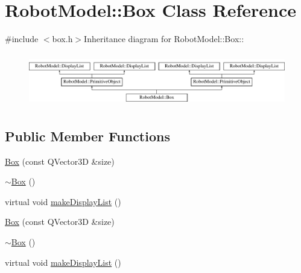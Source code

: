 \hypertarget{class_robot_model_1_1_box}{
\section{RobotModel::Box Class Reference}
\label{class_robot_model_1_1_box}
}


{\ttfamily \#include $<$box.h$>$}Inheritance diagram for RobotModel::Box::\begin{figure}[H]
\begin{center}
\leavevmode
\includegraphics[height=2.35955cm]{class_robot_model_1_1_box}
\end{center}
\end{figure}
\subsection*{Public Member Functions}
\begin{DoxyCompactItemize}
\item 
\hyperlink{class_robot_model_1_1_box_a4f394975b4dadbd1fa34d124f33772cb}{Box} (const QVector3D \&size)
\item 
\hyperlink{class_robot_model_1_1_box_a6a5e09398e85d602a046b429062fb9c2}{$\sim$Box} ()
\item 
virtual void \hyperlink{class_robot_model_1_1_box_a29420d81c8b3622c95a1976593e2cc4b}{makeDisplayList} ()
\item 
\hyperlink{class_robot_model_1_1_box_a045eb20c935ee6c2b35213c7163f2418}{Box} (const QVector3D \&size)
\item 
\hyperlink{class_robot_model_1_1_box_af171ccea0a183894859a77ed105aeff6}{$\sim$Box} ()
\item 
virtual void \hyperlink{class_robot_model_1_1_box_a9499dafbda230821b419e3f578316d91}{makeDisplayList} ()
\end{DoxyCompactItemize}


